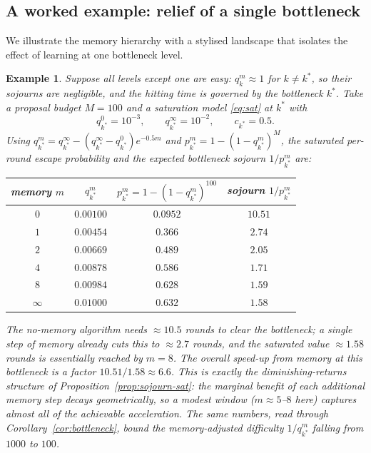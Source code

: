 \documentclass[11pt,a4paper]{article}
\newtheorem{example}[theorem]{Example}
\begin{document}
\subsection{A worked example: relief of a single bottleneck}
\label{sec:example}

We illustrate the memory hierarchy with a stylised landscape that
isolates the effect of learning at one bottleneck level.

\begin{example}\label{ex:bottleneck}
  Suppose all levels except one are easy: $q_k^m\approx1$ for $k\ne k^*$,
  so their sojourns are negligible, and the hitting time is governed by
  the bottleneck $k^*$.  Take a proposal budget $M=100$ and a saturation
  model \eqref{eq:sat} at $k^*$ with
  \[
    q_{k^*}^0=10^{-3},\qquad q_{k^*}^\infty=10^{-2},\qquad c_{k^*}=0.5 .
  \]
  Using $q_{k^*}^m=q_{k^*}^\infty-(q_{k^*}^\infty-q_{k^*}^0)e^{-0.5m}$ and
  $p_{k^*}^m=1-(1-q_{k^*}^m)^M$, the saturated per-round escape
  probability and the expected bottleneck sojourn $1/p_{k^*}^m$ are:

  \begin{center}
  \renewcommand{\arraystretch}{1.25}
  \begin{tabular}{@{}cccc@{}}
  \toprule
  memory $m$ & $q_{k^*}^m$ & $p_{k^*}^m=1-(1-q_{k^*}^m)^{100}$
    & sojourn $1/p_{k^*}^m$ \\
  \midrule
  $0$        & $0.00100$ & $0.0952$ & $10.51$ \\
  $1$        & $0.00454$ & $0.366$  & $2.74$  \\
  $2$        & $0.00669$ & $0.489$  & $2.05$  \\
  $4$        & $0.00878$ & $0.586$  & $1.71$  \\
  $8$        & $0.00984$ & $0.628$  & $1.59$  \\
  $\infty$   & $0.01000$ & $0.632$  & $1.58$  \\
  \bottomrule
  \end{tabular}
  \end{center}

  The no-memory algorithm needs $\approx10.5$ rounds to clear the
  bottleneck; a single step of memory already cuts this to $\approx2.7$
  rounds, and the saturated value $\approx1.58$ rounds is essentially
  reached by $m=8$. The overall speed-up from memory at this bottleneck
  is a factor $10.51/1.58\approx6.6$. This is exactly the
  diminishing-returns structure of
  Proposition~\ref{prop:sojourn-sat}: the marginal benefit of each
  additional memory step decays geometrically, so a modest window
  ($m\approx 5$--$8$ here) captures almost all of the achievable
  acceleration. The same numbers, read through
  Corollary~\ref{cor:bottleneck}, bound the memory-adjusted difficulty
  $1/q_{k^*}^m$ falling from $1000$ to $100$.
\end{example}
\end{document}
